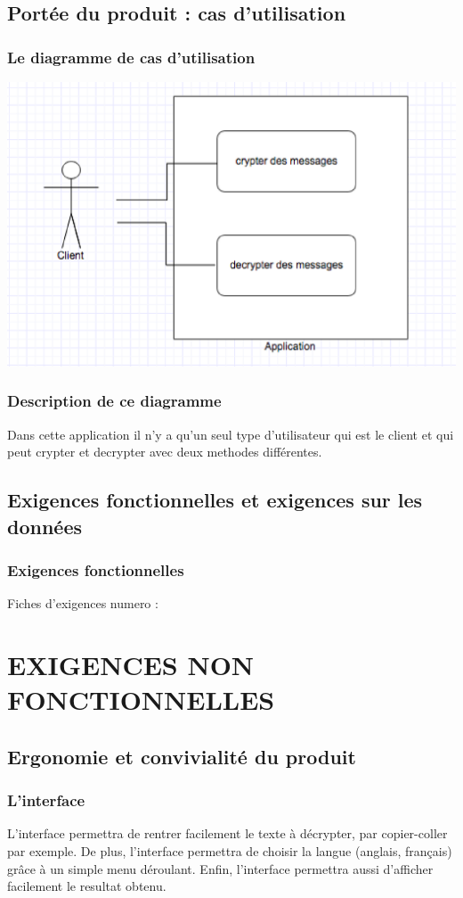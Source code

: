 \documentclass[a4]{article}
\begin{document}
		\subsection{Portée du produit : cas d’utilisation}
			\subsubsection {Le diagramme de cas d'utilisation} 
				\includegraphics[scale=0.5]{dia.eps} 
			\subsubsection {Description de ce diagramme}
				Dans cette application il n'y a qu'un seul type d'utilisateur qui est le client 
				et qui peut crypter et decrypter avec deux methodes différentes.
		\subsection{Exigences fonctionnelles et exigences sur les données}
			\subsubsection {Exigences fonctionnelles}
				Fiches d'exigences numero :
	\section{EXIGENCES NON FONCTIONNELLES}
		\subsection{Ergonomie et convivialité du produit}
			\subsubsection {L'interface}
				L'interface permettra de rentrer facilement le texte à décrypter, par copier-coller par 				exemple.
				De plus, l'interface permettra de choisir la langue (anglais, français) grâce à un simple menu 					déroulant.
				Enfin, l'interface permettra aussi d'afficher facilement le resultat obtenu.
\end{document}
